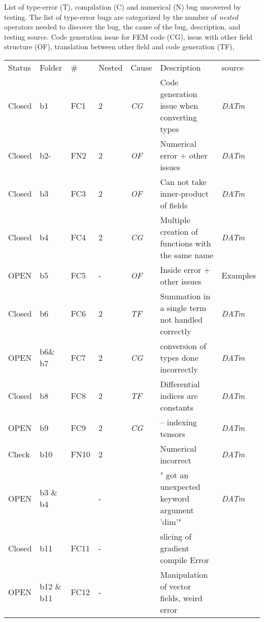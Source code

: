 \documentclass{article}
\newcommand{\fontit}[1]{\textit{#1}}
\newcommand{\checkname}[0]{\textit{DATm}}
\begin{document}
List of type-error (T), compilation (C) and numerical (N) bug uncovered by testing.
 The list of type-error bugs are categorized by the number of \fontit{nested} operators needed to discover the bug,  the cause of the bug, description, and testing source.
 Code generation issue for FEM code (CG), issue with other field structure (OF), translation between other field and code generation (TF),
\newline 
\begin{tabular}{|ll|llll|l|}
\hline
Status & Folder&\# &Nested & Cause & Description & source\\
Closed& b1 & FC1 &2&\fontit{CG}&Code generation issue when converting types&\checkname{}\\
Closed &b2- & FN2 &2&\fontit{OF}&Numerical error + other issues&\checkname{}\\
Closed&b3  & FC3 &2&\fontit{OF}& Can not take inner-product of fields&\checkname{} \\
Closed&b4  & FC4 &2&\fontit{CG}&Multiple creation of functions with the same name &\checkname{}\\
OPEN&b5 &FC5 &-&\fontit{OF}& Inside error + other issues& Examples\\
Closed &b6 &FC6 &2&\fontit{TF} &  Summation in a single term not handled correctly & \checkname{}\\
OPEN& b6\& b7 &FC7 &2& \fontit{CG}& conversion of types done incorrectly & \checkname{}\\
Closed &b8 &FC8 &2&  \fontit{TF}&Differential indices are constants& \checkname{}\\
OPEN&b9 &FC9 &2&  \fontit{CG}&-- indexing tensors& \checkname{}\\
Check &b10 &FN10 &2&  &Numerical incorrect& \checkname{}\\
OPEN & b3 \& b4 &  & -& &" got an unexpected keyword argument 'dim'"& \checkname{}\\
Closed & b11 & FC11 &-& &slicing of gradient compile Error\\
OPEN & b12 \& b11 & FC12 &-& &Manipulation of vector fields, weird error\\
\hline
\end{tabular}

\end{document}
